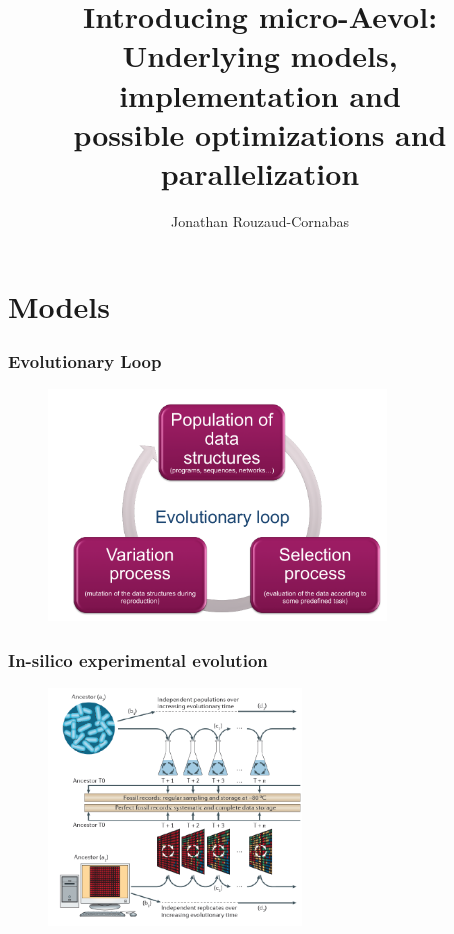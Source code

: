 \documentclass{beamer}
\title[Mini-Aevol]{Introducing micro-Aevol:\\ Underlying models, implementation and\\ possible optimizations and parallelization}
\author[J. Rouzaud-Cornabas]{Jonathan Rouzaud-Cornabas}
\institute[Insa de Lyon -- Inria]{LIRIS / Insa de Lyon -- Inria Beagle}
\date{}
\begin{document}
 
\begin{frame}
\maketitle
\end{frame}

\section{Models}

\begin{frame}
 \frametitle{Evolutionary Loop}
  \begin{figure}
        \includegraphics[width=0.8\textwidth]{figs/evol_loop}
\end{figure}
\end{frame}


\begin{frame}
 \frametitle{In-silico experimental evolution}
  \begin{figure}
        \includegraphics[width=0.6\textwidth]{figs/in_silico_evol}
\end{figure}
\end{frame}
\end{document}
